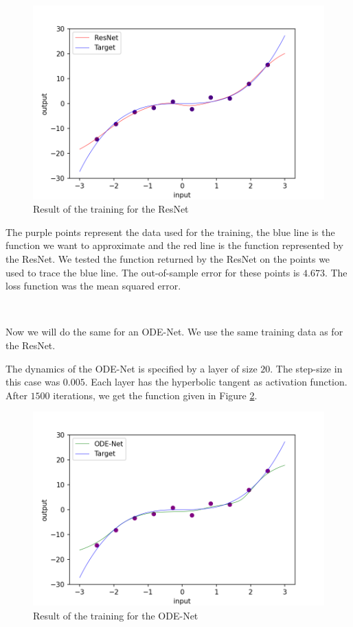 \documentclass[10pt,a4paper]{article}
\theoremstyle{definition}
\theoremstyle{plain}
\begin{document}
\begin{figure}[!h]
\center
\includegraphics[scale=0.75]{ex_resnet.png}
\caption{Result of the training for the ResNet}
\label{example_resnet}
\end{figure}

The purple points represent the data used for the training, the blue line is the function we want to approximate and the red line is the function represented by the ResNet. We tested the function returned by the ResNet on the points we used to trace the blue line. The out-of-sample error for these points is $4.673$. The loss function was the mean squared error.

~

Now we will do the same for an ODE-Net. We use the same training data as for the ResNet.

The dynamics of the ODE-Net is specified by a layer of size $20$. The step-size in this case was $0.005$. Each layer has the hyperbolic tangent as activation function. After $1500$ iterations, we get the function given in Figure \ref{example_odenet}.

\begin{figure}[!h]
\center
\includegraphics[scale=0.75]{ex_odenet_final.png}
\caption{Result of the training for the ODE-Net}
\label{example_odenet}
\end{figure}
\end{document}
